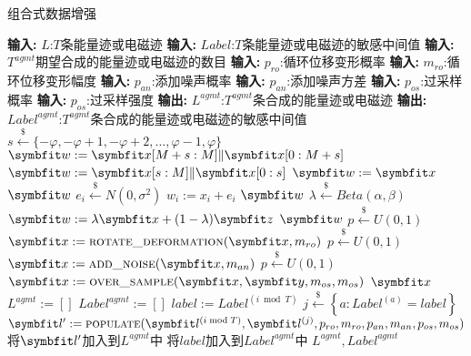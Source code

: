 {	\begin{breakablealgorithm}
		\caption{组合式数据增强}\label{alg:combined-da}
		\begin{algorithmic}[1]
			\Statex \textbf{输入:} $L$:$T$条能量迹或电磁迹
			\Statex \textbf{输入:} $Label$:$T$条能量迹或电磁迹的敏感中间值
			\Statex \textbf{输入:} $T^{agmt}$期望合成的能量迹或电磁迹的数目
			\Statex \textbf{输入:} $p_{ro}$:循环位移变形概率
			\Statex \textbf{输入:} $m_{ro}$:循环位移变形幅度
			\Statex \textbf{输入:} $p_{an}$:添加噪声概率
			\Statex \textbf{输入:} $p_{an}$:添加噪声方差
			\Statex \textbf{输入:} $p_{os}$:过采样概率
			\Statex \textbf{输入:} $p_{os}$:过采样强度
			\Statex \textbf{输出:} $L^{agmt}$:$T^{agmt}$条合成的能量迹或电磁迹
			\Statex \textbf{输出:} $Label^{agmt}$:$T^{agmt}$条合成的能量迹或电磁迹的敏感中间值
				\State $s\stackrel{\$}\gets\{-\varphi,-\varphi+1,-\varphi+2,\dots,\varphi-1,\varphi\}$
					\State $\Vector w:=\Vector x[M+s:M]\Vert\Vector x[0:M+s]$
					\State $\Vector w:=\Vector x[s:M]\Vert\Vector x[0:s]$
				\Else
					\State $\Vector w:=\Vector x$
				\EndIf
				\State \Return $\Vector w$
			\EndFunction
			\Statex 
					\State $e_i\stackrel{\$}\gets N(0,\sigma^2)$
					\State $w_i:= x_i+e_i$
				\EndFor
				\State \Return $\Vector w$
			\EndFunction
			\Statex 
				\State $\lambda\stackrel{\$}\gets Beta(\alpha,\beta)$
				\State $\Vector w:=\lambda\Vector x+(1-\lambda)\Vector z$
				\State \Return $\Vector w$
			\EndFunction
			\Statex 
				\State $p\stackrel{\$}\gets U(0,1)$
					\State $\Vector x:= \textsc {rotate\_deformation}(\Vector x,m_{ro})$
				\EndIf
				\State $p\stackrel{\$}\gets U(0,1)$
					\State $\Vector x:= \textsc{add\_noise}(\Vector x,m_{an})$
				\EndIf
				\State $p\stackrel{\$}\gets U(0,1)$
					\State $\Vector x:= \textsc{over\_sample}(\Vector x,\Vector y,m_{os},m_{os})$
				\EndIf
				\State \Return $\Vector x$
			\EndFunction
			\Statex 
			\State $L^{agmt}:=[]$
			\State $Label^{agmt}:=[]$
				\State $label:=Label^{(i\bmod T)}$
				\State $j\stackrel{\$}\gets\left\lbrace a:Label^{(a)}=label\right\rbrace $
				\State $\Vector {l^\prime}:=\textsc{populate}(\Vector {l^{(i\bmod T)}},\Vector l^{(j)},p_{ro},m_{ro},p_{an},m_{an},p_{os},m_{os})$
				\State 将$\Vector {l^\prime}$加入到$L^{agmt}$中
				\State 将$label$加入到$Label^{agmt}$中
			\EndFor
			\State \Return $L^{agmt},Label^{agmt}$
		\end{algorithmic}
	\end{breakablealgorithm}

}
